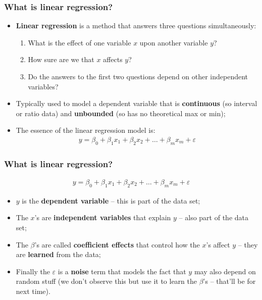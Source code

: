 \documentclass[aspectratio=169]{beamer}
\theoremstyle{principle}
\begin{document}
\begin{frame}
\frametitle{What is linear regression?}

\begin{itemize}
\item \textbf{Linear regression} is a method that answers three questions simultaneously:
\begin{enumerate}
\item What is the effect of one variable $x$ upon another variable $y$?
\item How sure are we that $x$ affects $y$?
\item Do the answers to the first two questions depend on other independent variables?
\end{enumerate}
\bigskip
\bigskip

\item Typically used to model a dependent variable that is \textbf{continuous} (so interval or ratio data) and \textbf{unbounded} (so has no theoretical max or min);
\bigskip
\bigskip

\item The essence of the linear regression model is:
\begin{align*}
y = \beta_0 + \beta_1x_1 + \beta_2x_2 + \hdots + \beta_mx_m + \varepsilon
\end{align*}

\end{itemize}

\end{frame}

\begin{frame}
\frametitle{What is linear regression?}
\begin{center}\huge
\begin{align*}
y = \beta_0 + \beta_1x_1 + \beta_2x_2 + \hdots + \beta_mx_m + \varepsilon
\end{align*}
\end{center}
\bigskip
\bigskip

\begin{itemize}
\item $y$ is the \textbf{dependent variable} -- this is part of the data set;
\item The $x$'s are \textbf{independent variables} that explain $y$ -- also part of the data set;
\item The $\beta$'s are called \textbf{coefficient effects} that control how the $x$'s affect $y$ -- they are \textbf{learned} from the data;
\item Finally the $\varepsilon$ is a \textbf{noise} term that models the fact that $y$ may also depend on random stuff (we don't observe this but use it to learn the $\beta$'s -- that'll be for next time).

\end{itemize}
\bigskip
\bigskip

\end{frame}
\end{document}
